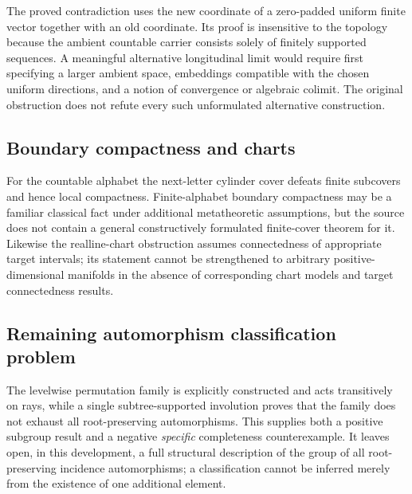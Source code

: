 The proved contradiction uses the new coordinate of a zero-padded uniform finite vector together with an old coordinate. Its proof is insensitive to the topology because the ambient countable carrier consists solely of finitely supported sequences. A meaningful alternative longitudinal limit would require first specifying a larger ambient space, embeddings compatible with the chosen uniform directions, and a notion of convergence or algebraic colimit. The original obstruction does not refute every such unformulated alternative construction.

\subsection{Boundary compactness and charts}\label{supp:16-5}
\par{}\par\smallskip

For the countable alphabet the next-letter cylinder cover defeats finite subcovers and hence local compactness. Finite-alphabet boundary compactness may be a familiar classical fact under additional metatheoretic assumptions, but the source does not contain a general constructively formulated finite-cover theorem for it. Likewise the realline-chart obstruction assumes connectedness of appropriate target intervals; its statement cannot be strengthened to arbitrary positive-dimensional manifolds in the absence of corresponding chart models and target connectedness results.

\subsection{Remaining automorphism classification problem}\label{supp:16-6}
\par{}\par\smallskip

The levelwise permutation family is explicitly constructed and acts transitively on rays, while a single subtree-supported involution proves that the family does not exhaust all root-preserving automorphisms. This supplies both a positive subgroup result and a negative \emph{specific} completeness counterexample. It leaves open, in this development, a full structural description of the group of all root-preserving incidence automorphisms; a classification cannot be inferred merely from the existence of one additional element.

